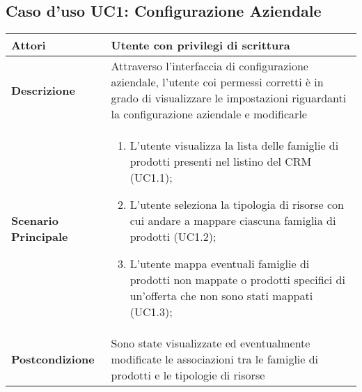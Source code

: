 
	\hypertarget{UC1}{}
	\subsection{Caso d'uso UC1: Configurazione Aziendale}
	\begin{longtable}{ | p{2.7cm} | p{12cm} |}
		\hline \textbf{Attori} & Utente con privilegi di scrittura\\ 
		\hline \textbf{Descrizione} & Attraverso l’interfaccia di configurazione aziendale, l’utente coi permessi corretti è in grado di visualizzare le impostazioni riguardanti la configurazione aziendale e modificarle\\ 
		\hline \textbf{Scenario Principale} & \begin{enumerate}
			\item L’utente visualizza la lista delle famiglie di prodotti presenti nel listino del CRM  (UC1.1);
			\item L’utente seleziona la tipologia di risorse con cui andare a mappare ciascuna famiglia di prodotti  (UC1.2);
			\item L’utente mappa eventuali famiglie di prodotti non mappate o prodotti specifici di un’offerta che non sono stati mappati  (UC1.3);
			
		\end{enumerate}
		\\ 
		\hline \textbf{Postcondizione} & Sono state visualizzate ed eventualmente modificate le associazioni tra le famiglie di prodotti e le tipologie di risorse\\ 
		\hline 
	\end{longtable}
	
	\hypertarget{UC1.2}{}
